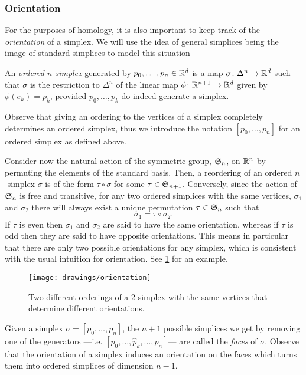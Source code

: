 \documentclass[../main.tex]{subfiles}
\begin{document}
\subsubsection{Orientation}
For the purposes of homology, it is also important to keep track of the \emph{orientation} of a
simplex. We will use the idea of general simplices being the image of standard simplices
to model this situation
\begin{definition}
	An \emph{ordered \( n \)-simplex} generated by \( p_0, \dots, p_n \in \R^d \) is a map
	\( \sigma \colon \Delta^n \to \R^d \) such that \( \sigma \) is the restriction to \(
	\Delta^n \) of the linear map \( \phi \colon \R^{n+1} \to \R^d \) given by \( \phi(e_k)
	= p_k \), provided \( p_0, \dots, p_k \) do indeed generate a simplex. 
\end{definition}
Observe that giving an ordering to the vertices of a simplex completely determines an
ordered simplex, thus we introduce the notation \( [p_0, \dots, p_n] \) for an ordered
simplex as defined above. 

Consider now the natural action of the symmetric group, \( \S_n \), on \( \R^n \) by
permuting the elements of the standard basis. Then, a reordering of an ordered \( n
\)-simplex \( \sigma \) is of the form \( \tau \circ \sigma \) for some \( \tau \in
\S_{n+1} \). Conversely, since the action of \( \S_n \) is free and transitive, for any
two ordered simplices with the same vertices,  \( \sigma_1 \) and \( \sigma_2 \) there
will always exist a unique permutation \( \tau \in \S_n \) such that
\begin{equation*}
	\sigma_1 = \tau \circ \sigma_2.
\end{equation*}
If \( \tau \) is even then \( \sigma_1 \) and \( \sigma_2 \) are said to have the same
orientation, whereas if \( \tau \) is odd then they are said to have opposite
orientations. This means in particular that there are only two possible orientations for
any simplex, which is consistent with the usual intuition for orientation. See
\cref{fig:orientation} for an example. 

\begin{figure}[htb]
	\centering
	\texttt{[image: drawings/orientation]}
	\caption{Two different orderings of a 2-simplex with the same vertices that determine
	different orientations.}
	\label{fig:orientation}
\end{figure}

Given a simplex \( \sigma = [p_0, \dots, p_n] \), the \( n+1 \) possible simplices we get by
removing one of the generators ---i.e. \( [p_0, \dots, \hat{p}_k, \dots, p_n] \)--- are
called the \emph{faces} of \( \sigma \). Observe that the orientation of a simplex induces
an orientation on the faces which turns them into ordered simplices of dimension \( n-1
\).
\end{document}
